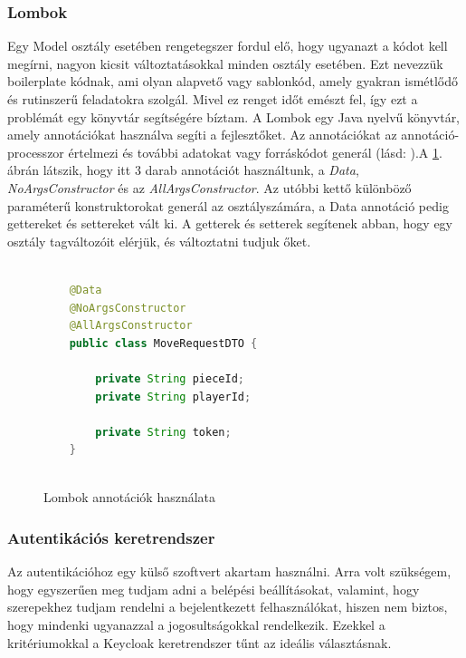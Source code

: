 \documentclass[a4paper,twoside]{article}
\begin{document}
\subsubsection{Lombok}
Egy Model osztály esetében rengetegszer fordul elő, hogy ugyanazt a kódot kell megírni, nagyon kicsit változtatásokkal minden osztály esetében. Ezt nevezzük boilerplate kódnak, ami olyan alapvető vagy sablonkód, amely gyakran ismétlődő és rutinszerű feladatokra szolgál. Mivel ez renget időt emészt fel, így ezt a problémát egy könyvtár segítségére bíztam. 
A Lombok \cite{lombok}  egy Java nyelvű könyvtár, amely
annotációkat használva segíti a fejlesztőket. Az annotációkat az annotáció-processzor értelmezi és további adatokat vagy forráskódot generál (lásd: \cite{lombokWork}).A \ref{lombok}. ábrán látszik, hogy itt 3 darab annotációt használtunk, a \textit{Data}, \textit{NoArgsConstructor} és az \textit{AllArgsConstructor}. Az utóbbi kettő különböző paraméterű konstruktorokat generál az osztályszámára, a Data annotáció pedig gettereket és settereket vált ki. A getterek és setterek segítenek abban, hogy egy osztály tagváltozóit elérjük, és változtatni tudjuk őket.
\begin{figure}
	\caption{Lombok annotációk használata}
	\centering
	\begin{lstlisting}[language=java]
		
	@Data
	@NoArgsConstructor
	@AllArgsConstructor
	public class MoveRequestDTO {
		
		private String pieceId;
		private String playerId;
		
		private String token;
	}
		
	\end{lstlisting}
	\label{lombok}
\end{figure} 

\subsubsection{Autentikációs keretrendszer}\label{auth-tech}
Az autentikációhoz egy külső szoftvert akartam használni. Arra volt szükségem, hogy egyszerűen meg tudjam adni a belépési beállításokat, valamint, hogy szerepekhez tudjam rendelni a bejelentkezett felhasználókat, hiszen nem biztos, hogy mindenki ugyanazzal a jogosultságokkal rendelkezik. Ezekkel a kritériumokkal a Keycloak\cite{keycloak} keretrendszer tűnt az ideális választásnak. 
\end{document}
